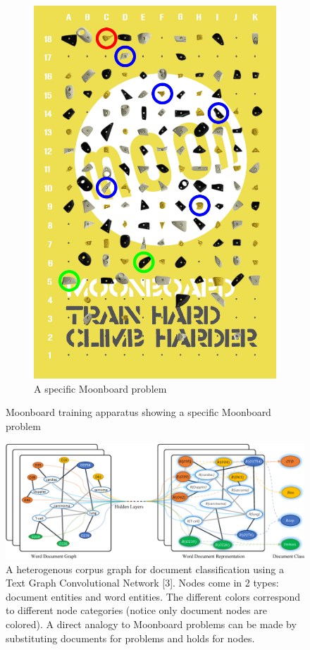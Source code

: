 \documentclass{article}
\begin{document}
\begin{figure}
\begin{subfigure}{.48\textwidth}
  \includegraphics[width=.8\linewidth]{moonboard_1}
  \caption{A specific Moonboard problem}
  \label{fig: Moonboard Problem}
\end{subfigure}
\caption{Moonboard training apparatus showing a specific Moonboard problem}
\end{figure}

\begin{figure}
\centering
\includegraphics[width=.8\linewidth]{textGCN}
\caption{A heterogenous corpus graph for document classification using a Text Graph Convolutional Network [3]. Nodes come in 2 types: document entities and word entities. The different colors correspond to different node categories (notice only document nodes are colored). A direct analogy to Moonboard problems can be made by substituting documents for problems and holds for nodes.}
\label{fig: Corpus graph for Text Graph Convolutional Network}
\end{figure}
\end{document}
